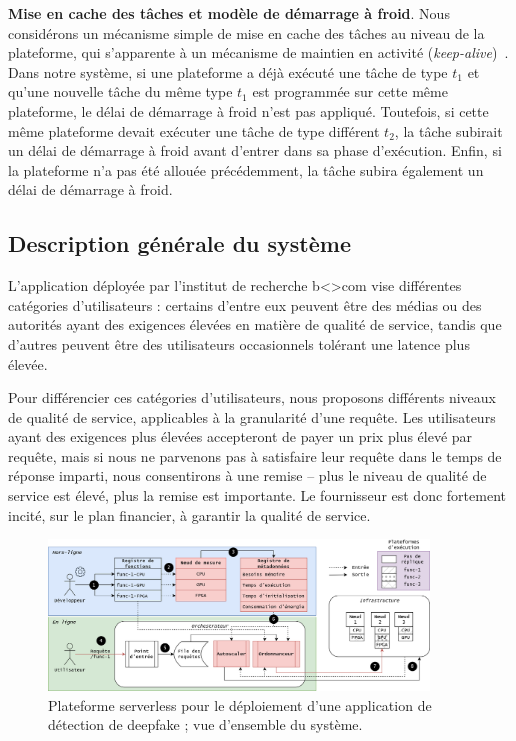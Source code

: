 \textbf{Mise en cache des tâches et modèle de démarrage à froid}. Nous considérons un mécanisme simple de mise en cache des tâches au niveau de la plateforme, qui s'apparente à un mécanisme de maintien en activité (\textit{keep-alive})~\cite{7279063}. Dans notre système, si une plateforme a déjà exécuté une tâche de type $t_1$ et qu'une nouvelle tâche du même type $t_1$ est programmée sur cette même plateforme, le délai de démarrage à froid n'est pas appliqué. Toutefois, si cette même plateforme devait exécuter une tâche de type différent $t_2$, la tâche subirait un délai de démarrage à froid avant d'entrer dans sa phase d'exécution. Enfin, si la plateforme n'a pas été allouée précédemment, la tâche subira également un délai de démarrage à froid.

\subsection{Description générale du système}

L'application déployée par l'institut de recherche b{\textless\textgreater}com vise différentes catégories d'utilisateurs : certains d'entre eux peuvent être des médias ou des autorités ayant des exigences élevées en matière de qualité de service, tandis que d'autres peuvent être des utilisateurs occasionnels tolérant une latence plus élevée.

Pour différencier ces catégories d'utilisateurs, nous proposons différents niveaux de qualité de service, applicables à la granularité d'une requête. Les utilisateurs ayant des exigences plus élevées accepteront de payer un prix plus élevé par requête, mais si nous ne parvenons pas à satisfaire leur requête dans le temps de réponse imparti, nous consentirons à une remise -- plus le niveau de qualité de service est élevé, plus la remise est importante. Le fournisseur est donc fortement incité, sur le plan financier, à garantir la qualité de service.

\begin{figure}[!ht]
    \centering
    \includegraphics[width=0.9\textwidth]{4_Chapitre4/figures/placement.png}
    \caption{Plateforme serverless pour le déploiement d'une application de détection de deepfake ; vue d'ensemble du système.}
    \label{figure:herofake-placement}
\end{figure}

